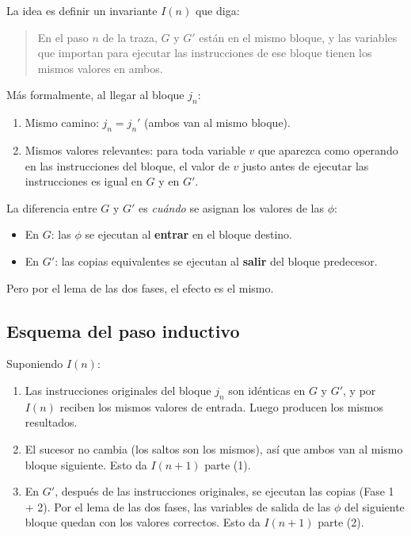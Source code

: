 \documentclass[12pt, a4paper]{article}
\begin{document}
La idea es definir un invariante $I(n)$ que diga:

\begin{quote}
  En el paso $n$ de la traza, $G$ y $G'$ están en el mismo bloque, y las variables que
  importan para ejecutar las instrucciones de ese bloque tienen los mismos valores en
  ambos.
\end{quote}

Más formalmente, al llegar al bloque $j_n$:
\begin{enumerate}
  \item Mismo camino: $j_n = j_n'$ (ambos van al mismo bloque).
  \item Mismos valores relevantes: para toda variable $v$ que aparezca como operando en
    las instrucciones del bloque, el valor de $v$ justo antes de ejecutar las instrucciones
    es igual en $G$ y en $G'$.
\end{enumerate}

La diferencia entre $G$ y $G'$ es \emph{cuándo} se asignan los valores de las $\phi$:
\begin{itemize}
  \item En $G$: las $\phi$ se ejecutan al \textbf{entrar} en el bloque destino.
  \item En $G'$: las copias equivalentes se ejecutan al \textbf{salir} del bloque predecesor.
\end{itemize}
Pero por el lema de las dos fases, el efecto es el mismo.

\subsection{Esquema del paso inductivo}

Suponiendo $I(n)$:

\begin{enumerate}
  \item Las instrucciones originales del bloque $j_n$ son idénticas en $G$ y $G'$, y por
    $I(n)$ reciben los mismos valores de entrada. Luego producen los mismos resultados.
  \item El sucesor no cambia (los saltos son los mismos), así que ambos van al mismo bloque
    siguiente. Esto da $I(n+1)$ parte (1).
  \item En $G'$, después de las instrucciones originales, se ejecutan las copias (Fase 1 + 2).
    Por el lema de las dos fases, las variables de salida de las $\phi$ del siguiente bloque
    quedan con los valores correctos. Esto da $I(n+1)$ parte (2).
\end{enumerate}
\end{document}
